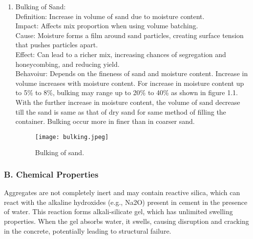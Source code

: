 \documentclass[a4paper,11pt]{book}
\begin{document}
\begin{enumerate}
\item Bulking of Sand:
\\Definition: Increase in volume of sand due to moisture content.
\\Impact: Affects mix proportion when using volume batching.
\\Cause: Moisture forms a film around sand particles, creating surface tension that pushes particles apart.
\\Effect: Can lead to a richer mix, increasing chances of segregation and honeycombing, and reducing yield.
\\Behavoiur: Depends on the fineness of sand and moisture content. Increase in volume increases with moisture content. For increase in moisture content up to 5\% to 8\%, bulking may range up to 20\% to 40\% as shown in figure 1.1. With the further increase in moisture content, the volume of sand decrease till the sand is same as that of dry sand for same method of filling the container. Bulking occur more in finer than in coarser sand.

\begin{figure}[h]
    \centering
    \texttt{[image: bulking.jpeg]}
    \caption{Bulking of sand.}
    \label{fig:example}
\end{figure}

\end{enumerate}

\subsubsection{B. Chemical Properties}
Aggregates are not completely inert and may contain reactive silica, which can react with the alkaline hydroxides (e.g., Na2O) present in cement in the presence of water. This reaction forms alkali-silicate gel, which has unlimited swelling properties. When the gel absorbs water, it swells, causing disruption and cracking in the concrete, potentially leading to structural failure.
\end{document}
